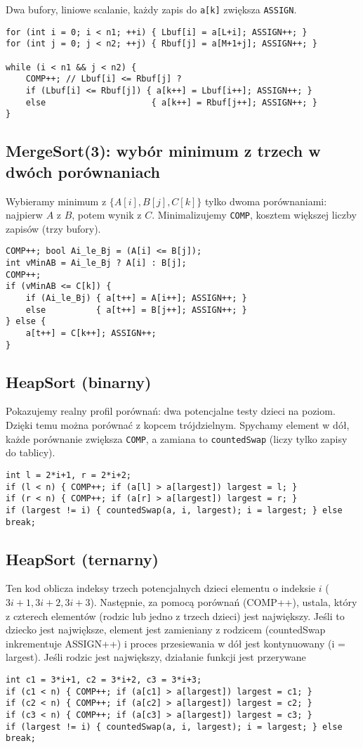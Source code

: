 \documentclass{article}
\begin{document}
 Dwa bufory, liniowe scalanie, każdy zapis do \texttt{a[k]} zwiększa \texttt{ASSIGN}.
\begin{lstlisting}
for (int i = 0; i < n1; ++i) { Lbuf[i] = a[L+i]; ASSIGN++; }
for (int j = 0; j < n2; ++j) { Rbuf[j] = a[M+1+j]; ASSIGN++; }

while (i < n1 && j < n2) {
    COMP++; // Lbuf[i] <= Rbuf[j] ?
    if (Lbuf[i] <= Rbuf[j]) { a[k++] = Lbuf[i++]; ASSIGN++; }
    else                     { a[k++] = Rbuf[j++]; ASSIGN++; }
}
\end{lstlisting}

\subsection{MergeSort(3): wybór minimum z trzech w dwóch porównaniach}
 Wybieramy minimum z \(\{A[i],B[j],C[k]\}\) tylko dwoma porównaniami: najpierw \(A\) z \(B\), potem wynik z \(C\). Minimalizujemy \texttt{COMP}, kosztem większej liczby zapisów (trzy bufory).

\begin{lstlisting}
COMP++; bool Ai_le_Bj = (A[i] <= B[j]);
int vMinAB = Ai_le_Bj ? A[i] : B[j];
COMP++; 
if (vMinAB <= C[k]) {
    if (Ai_le_Bj) { a[t++] = A[i++]; ASSIGN++; }
    else          { a[t++] = B[j++]; ASSIGN++; }
} else {
    a[t++] = C[k++]; ASSIGN++;
}
\end{lstlisting}

\subsection{HeapSort (binarny)}
 Pokazujemy realny profil porównań: dwa potencjalne testy dzieci na poziom. Dzięki temu można porównać z kopcem trójdzielnym.
 Spychamy element w dół, każde porównanie zwiększa \texttt{COMP}, a zamiana to \texttt{countedSwap} (liczy tylko zapisy do tablicy).
\begin{lstlisting}
int l = 2*i+1, r = 2*i+2;
if (l < n) { COMP++; if (a[l] > a[largest]) largest = l; }
if (r < n) { COMP++; if (a[r] > a[largest]) largest = r; }
if (largest != i) { countedSwap(a, i, largest); i = largest; } else break;
\end{lstlisting}

\subsection{HeapSort (ternarny)}
Ten kod oblicza indeksy trzech potencjalnych dzieci elementu o indeksie $i$ ($3i+1, 3i+2, 3i+3$). Następnie, za pomocą porównań (COMP++), ustala, który z czterech elementów (rodzic lub jedno z trzech dzieci) jest największy. Jeśli to dziecko jest największe, element jest zamieniany z rodzicem (countedSwap inkrementuje ASSIGN++) i proces przesiewania w dół jest kontynuowany (i = largest). Jeśli rodzic jest największy, działanie funkcji jest przerywane 
\begin{lstlisting}
int c1 = 3*i+1, c2 = 3*i+2, c3 = 3*i+3;
if (c1 < n) { COMP++; if (a[c1] > a[largest]) largest = c1; }
if (c2 < n) { COMP++; if (a[c2] > a[largest]) largest = c2; }
if (c3 < n) { COMP++; if (a[c3] > a[largest]) largest = c3; }
if (largest != i) { countedSwap(a, i, largest); i = largest; } else break;
\end{lstlisting}
\end{document}
